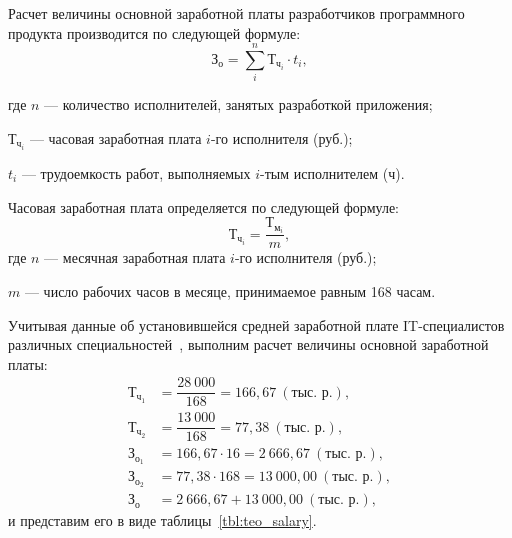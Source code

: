 Расчет величины основной заработной платы разработчиков программного
продукта производится по следующей формуле:
\begin{equation}
  \text{З}_{\text{о}} =
  \sum^n_i \text{Т}_{\text{ч}_{i}} \cdot t_{i},
\end{equation}

\noindent где
\( n \)
--- количество исполнителей, занятых разработкой приложения; \par
\noindent \hspace{6.5mm} \( \text{Т}_{\text{ч}_{i}} \)
--- часовая заработная плата \( i \)-го исполнителя (руб.); \par
\noindent \hspace{6.5mm} \( t_i \)
--- трудоемкость работ, выполняемых \( i \)-тым исполнителем (ч).

Часовая заработная плата определяется по следующей формуле:
\begin{equation}
  \text{Т}_{\text{ч}_{i}} =
  \dfrac{\text{Т}_{\text{м}_{i}}}{m},
\end{equation}
\noindent где
\( n \)
--- месячная заработная плата \( i \)-го исполнителя (руб.); \par
\noindent \hspace{6.2mm} \( m \)
--- число рабочих часов в месяце, принимаемое равным 168 часам.

Учитывая данные об установившейся средней заработной
плате IT-специалистов различных специальностей~\cite{dev_by_salaries},
выполним расчет величины основной заработной платы:
\begin{equation}
  \label{eq:teo_salary}
  \begin{aligned}
    \text{Т}_{\text{ч}_{1}}& = \dfrac{28 \: 000}{168} = 166{,}67 \: (\text{тыс. р.}), \\[1mm]
    \text{Т}_{\text{ч}_{2}}& = \dfrac{13 \: 000}{168} = 77{,}38 \: (\text{тыс. р.}), \\[1mm]
    \text{З}_{\text{о}_1}& = 166{,}67 \cdot 16 = 2 \: 666{,}67 \: (\text{тыс. р.}), \\
    \text{З}_{\text{о}_2}& = 77{,}38 \cdot 168 = 13 \: 000{,}00 \: (\text{тыс. р.}), \\
    \text{З}_{\text{о}}& = 2 \: 666{,}67 + 13 \: 000{,}00 \: (\text{тыс. р.}),
  \end{aligned}
\end{equation}
и представим его в виде таблицы~\ref{tbl:teo_salary}.

